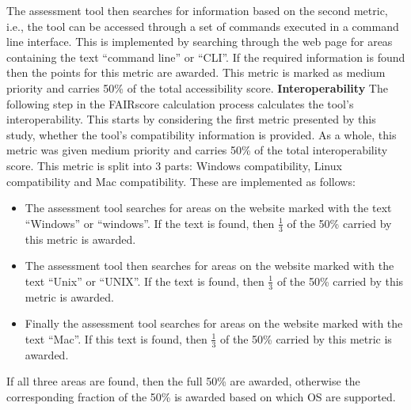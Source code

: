 \documentclass{cisfyp}
\begin{document}
The assessment tool then searches for information based on the second metric, i.e., the tool can be accessed through a set of commands executed in a command line interface. This is implemented by searching through the web page for areas containing the text ``command line'' or ``CLI''. If the required information is found then the points for this metric are awarded. This metric is marked as medium priority and carries 50\% of the total accessibility score.\newline
\textbf{Interoperability}\newline
The following step in the FAIRscore calculation process calculates the tool's interoperability. This starts by considering the first metric presented by this study, whether the tool's compatibility information is provided. As a whole, this metric was given medium priority and carries 50\% of the total interoperability score. This metric is split into 3 parts: Windows compatibility, Linux compatibility and Mac compatibility. These are implemented as follows:
\begin{itemize}
	\item The assessment tool searches for areas on the website marked with the text ``Windows'' or ``windows''. If the text is found, then  \( \frac{1}{3} \) of the 50\% carried by this metric is awarded.
	\item The assessment tool then searches for areas on the website marked with the text ``Unix'' or ``UNIX''. If the text is found, then  \( \frac{1}{3} \) of the 50\% carried by this metric is awarded.
	\item Finally the assessment tool searches for areas on the website marked with the text ``Mac''. If this text is found,  then  \( \frac{1}{3} \) of the 50\% carried by this metric is awarded.
\end{itemize}
If all three areas are found, then the full 50\% are awarded, otherwise the corresponding fraction of the 50\% is awarded based on which OS are supported.
\end{document}
